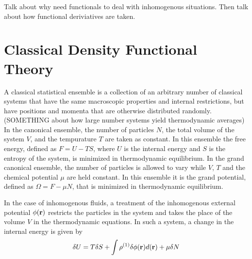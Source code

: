 Talk about why need functionals to deal with inhomogenous situations.
Then talk about how functional deriviatives are taken.

\section{Classical Density Functional Theory}

A classical statistical ensemble is a collection of an arbitrary
number of classical systems that have the same macroscopic properties
and internal restrictions, but have positions and momenta that are
otherwise distributed randomly.  (SOMETHING about how large number
systems yield thermodynamic averages) In the canonical ensemble, the
number of particles $N$, the total volume of the system $V$, and the
tempurature $T$ are taken as constant.  In this ensemble the free
energy, defined as $F = U - TS$, where $U$ is the internal energy and
$S$ is the entropy of the system, is minimized in thermodynamic
equilibrium. In the grand canonical ensemble, the number of particles
is allowed to vary while $V$, $T$ and the chemical potential $\mu$ are
held constant.  In this ensemble it is the grand potential, defined as
$\Omega = F - \mu N$, that is minimized in thermodynamic equilibrium.

In the case of inhomogenous fluids, a treatment of the inhomogenous
external potential $\phi(\textbf{r})$ restricts the particles in the system
and takes the place of the volume $V$ in the thermodynamic equations.
In such a system, a change in the internal energy is given by
\begin{align}
  \delta U = T\delta S + \int \rho^{(1)}\delta \phi(\textbf{r})d(\textbf{r}) + \mu \delta N
\end{align}

